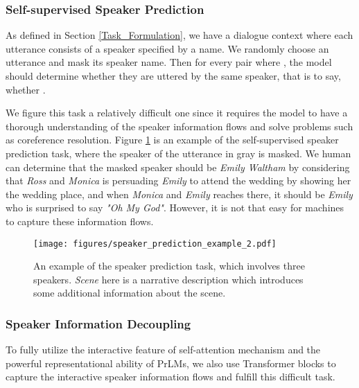 \documentclass[11pt]{article}
\begin{document}
	\subsubsection{Self-supervised Speaker Prediction}
	As defined in Section \ref{Task_Formulation}, we have a dialogue context  where each utterance  consists of a speaker  specified by a name. We randomly choose an  utterance and mask its speaker name. Then for every  pair where , the model should determine whether they are uttered by the same speaker, that is to say, whether .
	
	We figure this task a relatively difficult one since it requires the model to have a thorough understanding of the speaker information flows and solve problems such as coreference resolution. Figure \ref{speaker_prediction_exp} is an example of the self-supervised speaker prediction task, where the speaker of the utterance in gray is masked. We human can determine that the masked speaker should be \emph{Emily Waltham} by considering that \emph{Ross} and \emph{Monica} is persuading \emph{Emily} to attend the wedding by showing her the wedding place, and when \emph{Monica} and \emph{Emily} reaches there, it should be \emph{Emily} who is surprised to say \emph{"Oh My God"}. However, it is not that easy for machines to capture these information flows.
	
	\begin{figure}[htbp]
		\texttt{[image: figures/speaker\_prediction\_example\_2.pdf]}
		\centering
		\caption{An example of the speaker prediction task, which involves three speakers. \emph{Scene} here is a narrative description which introduces some additional information about the scene.}
\label{speaker_prediction_exp}
	\end{figure}
	
	\subsubsection{Speaker Information Decoupling}
	To fully utilize the interactive feature of self-attention mechanism \citep{vaswani2017attention} and the powerful representational ability of PrLMs, we also use Transformer blocks to capture the interactive speaker information flows and fulfill this difficult task.
	
\end{document}
